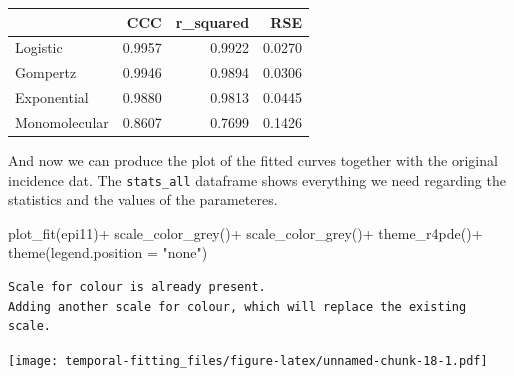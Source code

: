 \documentclass[
  letterpaper,
]{book}
\newenvironment{Shaded}{\begin{snugshade}}{\end{snugshade}}
\newcommand{\AttributeTok}[1]{\textcolor[rgb]{0.40,0.45,0.13}{#1}}
\newcommand{\FunctionTok}[1]{\textcolor[rgb]{0.28,0.35,0.67}{#1}}
\newcommand{\NormalTok}[1]{\textcolor[rgb]{0.00,0.23,0.31}{#1}}
\newcommand{\SpecialCharTok}[1]{\textcolor[rgb]{0.37,0.37,0.37}{#1}}
\newcommand{\StringTok}[1]{\textcolor[rgb]{0.13,0.47,0.30}{#1}}
\begin{document}
\begin{longtable}[]{@{}lrrr@{}}
\toprule\noalign{}
& CCC & r\_squared & RSE \\
\midrule\noalign{}
\endhead
\bottomrule\noalign{}
\endlastfoot
Logistic & 0.9957 & 0.9922 & 0.0270 \\
Gompertz & 0.9946 & 0.9894 & 0.0306 \\
Exponential & 0.9880 & 0.9813 & 0.0445 \\
Monomolecular & 0.8607 & 0.7699 & 0.1426 \\
\end{longtable}

And now we can produce the plot of the fitted curves together with the
original incidence dat. The \texttt{stats\_all} dataframe shows
everything we need regarding the statistics and the values of the
parameteres.

\begin{Shaded}
\begin{Highlighting}[]
\FunctionTok{plot\_fit}\NormalTok{(epi11)}\SpecialCharTok{+}
  \FunctionTok{scale\_color\_grey}\NormalTok{()}\SpecialCharTok{+}
  \FunctionTok{scale\_color\_grey}\NormalTok{()}\SpecialCharTok{+}
  \FunctionTok{theme\_r4pde}\NormalTok{()}\SpecialCharTok{+}
  \FunctionTok{theme}\NormalTok{(}\AttributeTok{legend.position =} \StringTok{"none"}\NormalTok{)}
\end{Highlighting}
\end{Shaded}

\begin{verbatim}
Scale for colour is already present.
Adding another scale for colour, which will replace the existing scale.
\end{verbatim}

\texttt{[image: temporal-fitting\_files/figure-latex/unnamed-chunk-18-1.pdf]}

\begin{Shaded}
\end{Shaded}
\end{document}
